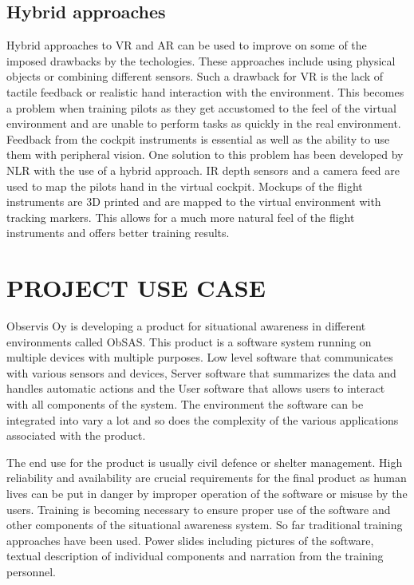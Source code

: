 \documentclass[12pt, a4paper,oneside, nocenter]{thesis}
\begin{document}
\section{Hybrid approaches}
\par
Hybrid approaches to VR and AR can be used to improve on some of the imposed drawbacks by the techologies. These approaches include using physical objects or combining different sensors.
Such a drawback for VR is the lack of tactile feedback or realistic hand interaction with the environment. This becomes a problem when training pilots as they get accustomed to the feel of the virtual environment and are unable to perform tasks as quickly in the real environment.
Feedback from the cockpit instruments is essential as well as the ability to use them with peripheral vision.
One solution to this problem has been developed by NLR with the use of a hybrid approach.
IR depth sensors and a camera feed are used to map the pilots hand in the virtual cockpit. Mockups of the flight instruments are 3D printed and are mapped to the virtual environment with tracking markers.
This allows for a much more natural feel of the flight instruments and offers better training results\citep{nlr-vr}.
\\
\chapter{\MakeUppercase{Project use case}}
Observis Oy is developing a product for situational awareness in different environments called ObSAS.
This product is a software system running on multiple devices with multiple purposes.
Low level software that communicates with various sensors and devices, Server software
that summarizes the data and handles automatic actions and the User software that allows users to interact
with all components of the system. The environment the software can be integrated 
into vary a lot and so does 
the complexity of the various applications associated with the product.
\par
The end use for the product is usually civil defence or shelter management.
High reliability and availability are crucial requirements for the final product as 
human lives can be put in danger by improper operation of the software or misuse by
the users. Training is becoming necessary to ensure proper use of the software and 
other components of the situational awareness system. So far traditional training 
approaches have been used. Power slides including pictures of the software, textual description of individual components and narration from the training personnel.
\par
\end{document}
